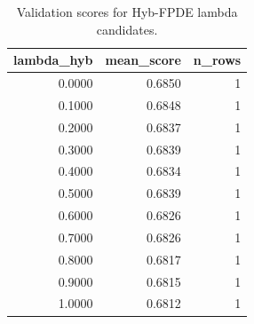 \begin{table}[t]
\caption{Validation scores for Hyb-FPDE lambda candidates.}
\label{tab:lambda_distribution_computed}
\centering
\begin{tabular}{rrr}
\toprule
lambda\_hyb & mean\_score & n\_rows \\
\midrule
0.0000 & 0.6850 & 1 \\
0.1000 & 0.6848 & 1 \\
0.2000 & 0.6837 & 1 \\
0.3000 & 0.6839 & 1 \\
0.4000 & 0.6834 & 1 \\
0.5000 & 0.6839 & 1 \\
0.6000 & 0.6826 & 1 \\
0.7000 & 0.6826 & 1 \\
0.8000 & 0.6817 & 1 \\
0.9000 & 0.6815 & 1 \\
1.0000 & 0.6812 & 1 \\
\bottomrule
\end{tabular}

\end{table}
